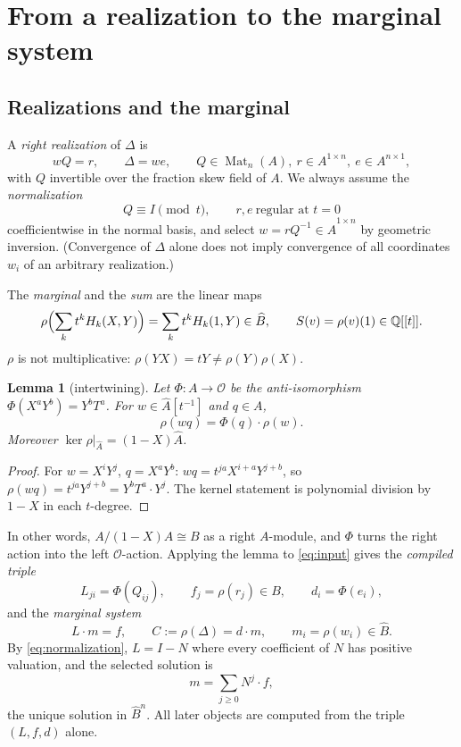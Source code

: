 \documentclass[11pt,a4paper]{article}
\newcommand{\Q}{\mathbb Q}
\newcommand{\Op}{\mathcal O}
\newcommand{\Bhat}{\widehat B}
\newcommand{\Ahat}{\widehat A}
\newcommand{\Mat}{\operatorname{Mat}}
\theoremstyle{plain}
\newtheorem{lemma}[theorem]{Lemma}
\theoremstyle{definition}
\theoremstyle{remark}
\begin{document}
\section{From a realization to the marginal system}\label{sec:input}

\subsection{Realizations and the marginal}
A \emph{right realization} of $\Delta$ is
\begin{equation}\label{eq:input}
  wQ=r,\qquad \Delta=we,\qquad Q\in\Mat_n(A),\ r\in A^{1\times n},\ e\in A^{n\times1},
\end{equation}
with $Q$ invertible over the fraction skew field of $A$. We always assume the
\emph{normalization}
\begin{equation}\label{eq:normalization}
  Q\equiv I\pmod t,\qquad r,e\ \text{regular at } t=0
\end{equation}
coefficientwise in the normal basis, and select $w=rQ^{-1}\in\Ahat^{1\times n}$
by geometric inversion. (Convergence of $\Delta$ alone does not imply convergence
of all coordinates $w_i$ of an arbitrary realization.)

The \emph{marginal} and the \emph{sum} are the linear maps
\[
  \rho\Bigl(\sum_k t^kH_k(X,Y)\Bigr)=\sum_kt^kH_k(1,Y)\in\Bhat,\qquad S(v)=\rho(v)(1)\in\Q[[t]].
\]
$\rho$ is not multiplicative: $\rho(YX)=tY\ne\rho(Y)\rho(X)$.

\begin{lemma}[intertwining]\label{lem:intertwining}
Let $\Phi:A\to\Op$ be the anti-isomorphism $\Phi(X^aY^b)=Y^bT^a$. For
$w\in\Ahat[t^{-1}]$ and $q\in A$,
\[
  \rho(wq)=\Phi(q)\cdot\rho(w).
\]
Moreover $\ker\rho|_{\Ahat}=(1-X)\Ahat$.
\end{lemma}
\begin{proof}
For $w=X^iY^j$, $q=X^aY^b$: $wq=t^{ja}X^{i+a}Y^{j+b}$, so
$\rho(wq)=t^{ja}Y^{j+b}=Y^bT^a\cdot Y^j$. The kernel statement is polynomial
division by $1-X$ in each $t$-degree.
\end{proof}

In other words, $A/(1-X)A\cong B$ as a right $A$-module, and $\Phi$ turns the
right action into the left $\Op$-action. Applying the lemma to
\eqref{eq:input} gives the \emph{compiled triple}
\begin{equation}\label{eq:triple}
  L_{ji}=\Phi(Q_{ij}),\qquad f_j=\rho(r_j)\in B,\qquad d_i=\Phi(e_i),
\end{equation}
and the \emph{marginal system}
\begin{equation}\label{eq:compiled}
  L\cdot m=f,\qquad C:=\rho(\Delta)=d\cdot m,\qquad m_i=\rho(w_i)\in\Bhat.
\end{equation}
By \eqref{eq:normalization}, $L=I-N$ where every coefficient of $N$ has positive
valuation, and the selected solution is
\begin{equation}\label{eq:geometric}
  m=\sum_{j\ge0}N^j\cdot f,
\end{equation}
the unique solution in $\Bhat^n$. All later objects are computed from the
triple $(L,f,d)$ alone.
\end{document}
